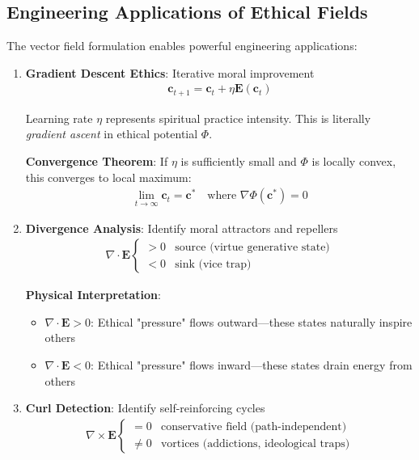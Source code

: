 \documentclass[11pt,a4paper]{article}
\theoremstyle{definition}
\theoremstyle{remark}
\newcommand{\EE}{\mathbf{E}}
\newcommand{\cc}{\mathbf{c}}
\begin{document}
\subsection{Engineering Applications of Ethical Fields}

The vector field formulation enables powerful engineering applications:

\begin{enumerate}[leftmargin=*]
\item \textbf{Gradient Descent Ethics}: Iterative moral improvement
\begin{align}
\cc_{t+1} = \cc_t + \eta \EE(\cc_t)
\end{align}

Learning rate \(\eta\) represents spiritual practice intensity. This is literally \textit{gradient ascent} in ethical potential \(\Phi\).

\textbf{Convergence Theorem}: If \(\eta\) is sufficiently small and \(\Phi\) is locally convex, this converges to local maximum:
\begin{align}
\lim_{t \to \infty} \cc_t = \cc^* \quad \text{where } \nabla \Phi(\cc^*) = 0
\end{align}

\item \textbf{Divergence Analysis}: Identify moral attractors and repellers
\begin{align}
\nabla \cdot \EE \begin{cases}
    > 0 & \text{source (virtue generative state)} \\
    < 0 & \text{sink (vice trap)}
\end{cases}
\end{align}

\textbf{Physical Interpretation}: 
\begin{itemize}
    \item \(\nabla \cdot \EE > 0\): Ethical "pressure" flows outward—these states naturally inspire others
    \item \(\nabla \cdot \EE < 0\): Ethical "pressure" flows inward—these states drain energy from others
\end{itemize}

\item \textbf{Curl Detection}: Identify self-reinforcing cycles
\begin{align}
\nabla \times \EE \begin{cases}
    = 0 & \text{conservative field (path-independent)} \\
    \neq 0 & \text{vortices (addictions, ideological traps)}
\end{cases}
\end{align}


\end{enumerate}
\end{document}
